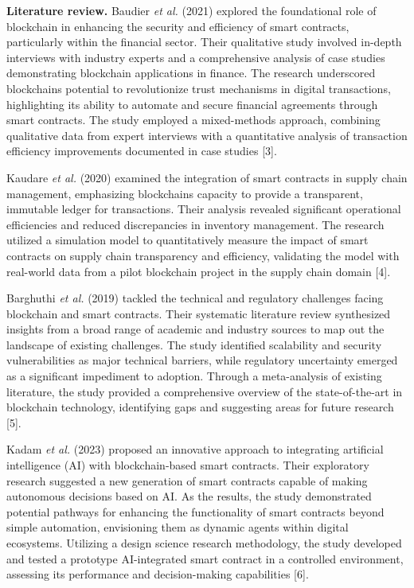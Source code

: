 \begin{multicols}{2}
{\bfseries Literature review.} Baudier \emph{et al.} (2021) explored the
foundational role of blockchain in enhancing the security and efficiency
of smart contracts, particularly within the financial sector. Their
qualitative study involved in-depth interviews with industry experts and
a comprehensive analysis of case studies demonstrating blockchain
applications in finance. The research underscored
blockchain\textquotesingle s potential to revolutionize trust mechanisms
in digital transactions, highlighting its ability to automate and secure
financial agreements through smart contracts. The study employed a
mixed-methods approach, combining qualitative data from expert
interviews with a quantitative analysis of transaction efficiency
improvements documented in case studies {[}3{]}.

Kaudare \emph{et al.} (2020) examined the integration of smart contracts
in supply chain management, emphasizing blockchain\textquotesingle s
capacity to provide a transparent, immutable ledger for transactions.
Their analysis revealed significant operational efficiencies and reduced
discrepancies in inventory management. The research utilized a
simulation model to quantitatively measure the impact of smart contracts
on supply chain transparency and efficiency, validating the model with
real-world data from a pilot blockchain project in the supply chain
domain {[}4{]}.

Barghuthi \emph{et al.} (2019) tackled the technical and regulatory
challenges facing blockchain and smart contracts. Their systematic
literature review synthesized insights from a broad range of academic
and industry sources to map out the landscape of existing challenges.
The study identified scalability and security vulnerabilities as major
technical barriers, while regulatory uncertainty emerged as a
significant impediment to adoption. Through a meta-analysis of existing
literature, the study provided a comprehensive overview of the
state-of-the-art in blockchain technology, identifying gaps and
suggesting areas for future research {[}5{]}.

Kadam \emph{et al.} (2023) proposed an innovative approach to
integrating artificial intelligence (AI) with blockchain-based smart
contracts. Their exploratory research suggested a new generation of
smart contracts capable of making autonomous decisions based on AI. As
the results, the study demonstrated potential pathways for enhancing the
functionality of smart contracts beyond simple automation, envisioning
them as dynamic agents within digital ecosystems. Utilizing a design
science research methodology, the study developed and tested a prototype
AI-integrated smart contract in a controlled environment, assessing its
performance and decision-making capabilities {[}6{]}.


\end{multicols}
